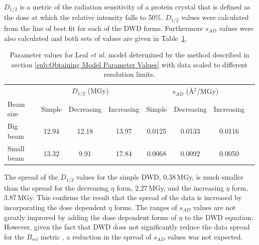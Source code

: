 $D_{1/2}$ is a metric of the radiation sensitivity of a protein crystal that is defined as the dose at which the relative intensity falls to 50\%.
$D_{1/2}$ values were calculated from the line of best fit for each of the DWD forms.
Furthermore $s_{AD}$ values were also calculated and both sets of values are given in Table~\ref{tab:Half dose and SAD values}.
\begin{table}[ht!]
\small
\captionsetup{justification=centering}
	\caption{Parameter values for Leal \emph{et al.} model determined by the method described in section \ref{sub:Obtaining Model Parameter Values} with data scaled to different resolution limits.}
	\centering
	\begin{tabular}{p{2cm}*{6}{c}r}
		& \multicolumn{3}{c}{$D_{1/2}$ (MGy)} & \multicolumn{3}{c}{$s_{AD}$ (\AA$^2$/MGy)} \\
		\cmidrule(l{2pt}r{2pt}){2-4} \cmidrule(l{2pt}r{2pt}){5-7}
		Beam size			&Simple	    &Decreasing   &Increasing     &Simple	    &Decreasing   &Increasing	\\
		\hline
		Big beam    		&12.94	    &12.18 	      &13.97         &0.0125	    &0.0133	      &0.0116	\\
		Small beam     		&13.32		&9.91 	      &17.84         &0.0068	    &0.0092       &0.0050     \\
		\hline
	\end{tabular}
	\label{tab:Half dose and SAD values}
\end{table}
The spread of the $D_{1/2}$ values for the simple DWD, $0.38\,$MGy, is much smaller than the spread for the decreasing $\eta$ form, $2.27\,$MGy, and the increasing $\eta$ form, $3.87\,$MGy.
This confirms the result that the spread of the data is increased by incorporating the dose dependent $\eta$ forms.
The ranges of $s_{AD}$ values are not greatly improved by adding the dose dependent forms of $\eta$ to the DWD equation.
However, given the fact that DWD does not significantly reduce the data spread for the $B_{rel}$ metric \cite{zeldin2013dwd}, a reduction in the spread of $s_{AD}$ values was not expected.

